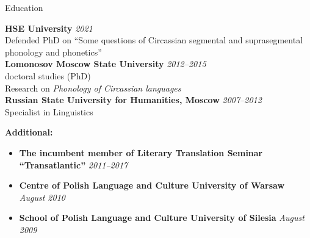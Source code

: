 \documentclass{resume} %
\begin{document}

\begin{rSection}{Education}

{\bf HSE University} \hfill {\em 2021} \\
Defended PhD on ``Some questions of Circassian segmental and suprasegmental phonology and phonetics''\\
{\bf Lomonosov Moscow State University} \hfill {\em 2012--2015} \\
doctoral studies (PhD)\\
Research on \textit{Phonology of Circassian languages}\\
{\bf Russian State University for Humanities, Moscow} \hfill {\em 2007--2012} \\
Specialist in Linguistics

{\bf Additional:}
\begin{itemize}
\item {\bf The incumbent member of Literary Translation Seminar ``Transatlantic''} \hfill {\em 2011--2017}
\item {\bf Centre of Polish Language and Culture University of Warsaw} \hfill {\em August 2010}
\item {\bf School of Polish Language and Culture University of Silesia} \hfill {\em August 2009}
\end{itemize}

\end{rSection}

\end{document}
